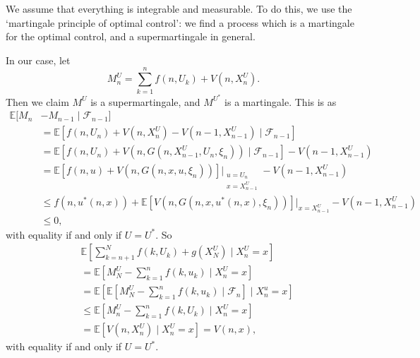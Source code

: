 \documentclass[12pt]{article}
\begin{document}
\begin{proofbox}
	We assume that everything is integrable and measurable. To do this, we use the `martingale principle of optimal control': we find a process which is a martingale for the optimal control, and a supermartingale in general.

	In our case, let
	\[
	M_n^U = \sum_{k = 1}^n f(n, U_k) + V(n, X_n^U).
	\]
	Then we claim $M^U$ is a supermartingale, and $M^{U^\ast}$ is a martingale. This is as
	\begin{align*}
		\mathbb{E}[M_n &- M_{n-1} \mid \mathcal{F}_{n-1}]  \\
		&= \mathbb{E}[f(n, U_n) + V(n, X_n^U) - V(n-1, X_{n-1}^U) \mid \mathcal{F}_{n-1}] \\
		&= \mathbb{E}[f(n, U_n) + V(n, G(n, X_{n-1}^U, U_n, \xi_n)) \mid \mathcal{F}_{n-1}] - V(n-1, X_{n-1}^U) \\
		&= \mathbb{E}[f(n, u) + V(n, G(n, x, u, \xi_n))] \biggr|_{\substack{u = U_n \\ x = X_{n-1}^U}} - V(n-1, X_{n-1}^U) \\
		&\leq f(n, u^\ast(n, x)) + \mathbb{E}[V(n, G(n, x, u^\ast(n, x), \xi_n))] \biggr|_{x = X_{n-1}^U} \!\!\!\!- V(n-1, X_{n-1}^U) \\
		&\leq 0,
	\end{align*}
	with equality if and only if $U = U^\ast$. So
	\begin{align*}
		&\mathbb{E}\left[ \sum_{k = n+1}^N f(k, U_k) + g(X_N^U) \mid X_n^U = x \right] \\
		&= \mathbb{E}\left[ M_N^U - \sum_{k = 1}^n f(k, u_k) \mid X_{n}^U = x \right] \\
		&= \mathbb{E}\left[\mathbb{E}\left[ M_N^U - \sum_{k = 1}^n f(k, u_k) \mid \mathcal{F}_{n} \right] \mid X_{n}^u = x \right] \\
		&\leq \mathbb{E}\left[ M_n^U - \sum_{k = 1}^n f(k, U_k) \mid X_n^U = x \right] \\
		&= \mathbb{E}[V(n, X_n^U) \mid X_n^U = x] = V(n, x),
	\end{align*}
	with equality if and only if $U = U^\ast$.
\end{proofbox}
\end{document}
